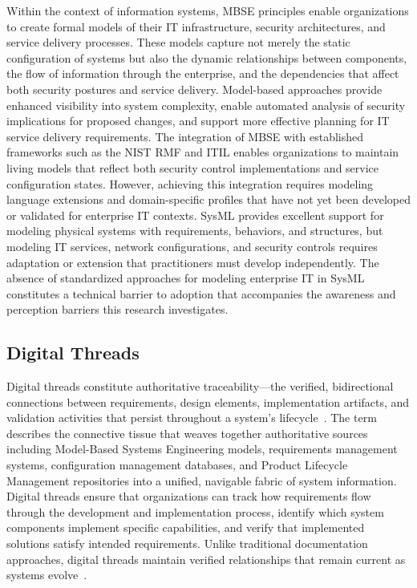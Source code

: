 Within the context of information systems, MBSE principles enable organizations to create formal models of their IT infrastructure, security architectures, and service delivery processes. These models capture not merely the static configuration of systems but also the dynamic relationships between components, the flow of information through the enterprise, and the dependencies that affect both security postures and service delivery. Model-based approaches provide enhanced visibility into system complexity, enable automated analysis of security implications for proposed changes, and support more effective planning for IT service delivery requirements. The integration of MBSE with established frameworks such as the NIST RMF and ITIL enables organizations to maintain living models that reflect both security control implementations and service configuration states. However, achieving this integration requires modeling language extensions and domain-specific profiles that have not yet been developed or validated for enterprise IT contexts. SysML provides excellent support for modeling physical systems with requirements, behaviors, and structures, but modeling IT services, network configurations, and security controls requires adaptation or extension that practitioners must develop independently. The absence of standardized approaches for modeling enterprise IT in SysML constitutes a technical barrier to adoption that accompanies the awareness and perception barriers this research investigates.

\subsection{Digital Threads}

Digital threads constitute authoritative traceability---the verified, bidirectional connections between requirements, design elements, implementation artifacts, and validation activities that persist throughout a system's lifecycle~\parencite{baker2020system}. The term describes the connective tissue that weaves together authoritative sources including Model-Based Systems Engineering models, requirements management systems, configuration management databases, and Product Lifecycle Management repositories into a unified, navigable fabric of system information. Digital threads ensure that organizations can track how requirements flow through the development and implementation process, identify which system components implement specific capabilities, and verify that implemented solutions satisfy intended requirements. Unlike traditional documentation approaches, digital threads maintain verified relationships that remain current as systems evolve~\parencite{zhang2021architecture}.

